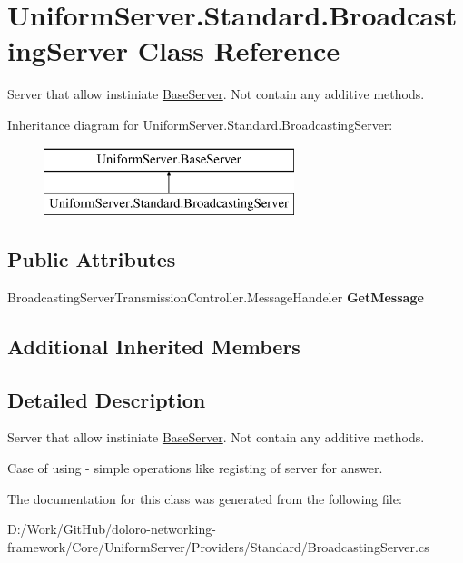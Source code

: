 \hypertarget{class_uniform_server_1_1_standard_1_1_broadcasting_server}{}\section{Uniform\+Server.\+Standard.\+Broadcasting\+Server Class Reference}
\label{class_uniform_server_1_1_standard_1_1_broadcasting_server}


Server that allow instiniate \mbox{\hyperlink{class_uniform_server_1_1_base_server}{Base\+Server}}. Not contain any additive methods.  


Inheritance diagram for Uniform\+Server.\+Standard.\+Broadcasting\+Server\+:\begin{figure}[H]
\begin{center}
\leavevmode
\includegraphics[height=2.000000cm]{d5/dac/class_uniform_server_1_1_standard_1_1_broadcasting_server}
\end{center}
\end{figure}
\subsection*{Public Attributes}
\begin{DoxyCompactItemize}
\item 
\mbox{\label{class_uniform_server_1_1_standard_1_1_broadcasting_server_a0c09cadabd5e8c941979bc7b32185c79}} 
Broadcasting\+Server\+Transmission\+Controller.\+Message\+Handeler {\bfseries Get\+Message}
\end{DoxyCompactItemize}
\subsection*{Additional Inherited Members}


\subsection{Detailed Description}
Server that allow instiniate \mbox{\hyperlink{class_uniform_server_1_1_base_server}{Base\+Server}}. Not contain any additive methods. 

Case of using -\/ simple operations like registing of server for answer. 

The documentation for this class was generated from the following file\+:\begin{DoxyCompactItemize}
\item 
D\+:/\+Work/\+Git\+Hub/doloro-\/networking-\/framework/\+Core/\+Uniform\+Server/\+Providers/\+Standard/Broadcasting\+Server.\+cs\end{DoxyCompactItemize}
